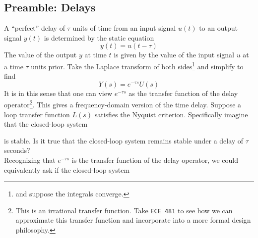\subsection{Preamble: Delays}
A ``perfect'' delay of \(\tau\) units of time from an input signal \(u(t)\) to an output signal \(y(t)\) is determined by the static equation
\[
  y(t) = u(t - \tau)
\]
The value of the output \(y\) at time \(t\) is given by the value of the input signal \(u\) at a time \(\tau\) units prior.
Take the Laplace transform of both sides\footnote{and suppose the integrals converge.} and simplify to find
\[
  Y(s) = e^{-\tau s} U(s)
\]
It is in this sense that one can view \(e^{-\tau s}\) as the transfer function of the delay operator\footnote{This is an irrational transfer function. Take \texttt{ECE 481} to see how we can approximate this transfer function and incorporate into a more formal design philosophy.}.
This gives a frequency-domain version of the time delay.
%
Suppose a loop transfer function \(L(s)\) satisfies the Nyquist criterion.
Specifically imagine that the closed-loop system
%
\begin{center}
\end{center}
%
is stable.
Is it true that the closed-loop system remains stable under a delay of \(\tau\) seconds?\\
Recognizing that \(e^{-\tau s}\) is the transfer function of the delay operator, we could equivalently ask if the closed-loop system
%
